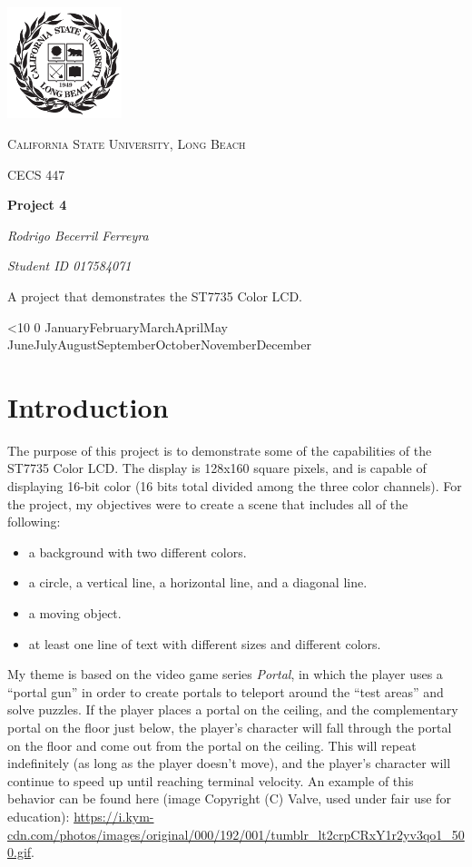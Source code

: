\documentclass{article}
\renewcommand{\today}{\ifnum\number\day<10 0\fi \number\day \space%
\ifcase \month \or January\or February\or March\or April\or May%
\or June\or July\or August\or September\or October\or November\or December\fi\space%
\number \year}
\begin{document}
\begin{titlepage}
	\centering
	\includegraphics[width=0.25\textwidth]{Images/247px-CSU-Longbeach_seal}\par\vspace{1cm}
	{\scshape\Large California State University, Long Beach \par}
	\vspace{1cm}
	{\scshape\Large CECS 447\par}
	\vspace{1.5cm}
	{\huge\bfseries Project 4\par}
	\vspace{2cm}
    {\Large\itshape Rodrigo Becerril Ferreyra\par}
    {\itshape\Large Student ID 017584071 \par}
	\vfill
    A project that demonstrates the ST7735
	Color LCD.

	\vfill

	{\large \today\par}
\end{titlepage}

\section{Introduction}
The purpose of this project is to demonstrate some of the
capabilities of the ST7735 Color LCD. The display is
128x160 square pixels, and is capable of displaying
16-bit color (16 bits total divided among the three color
channels). For the project, my objectives were to create a
scene that includes all of the following:
\begin{itemize}
	\item a background with two different colors.
	\item a circle, a vertical line, a horizontal line,
	and a diagonal line.
	\item a moving object.
	\item at least one line of text with different sizes
	and different colors.
\end{itemize}

My theme is based on the video game series \emph{Portal},
in which the player uses a ``portal gun'' in order to create
portals to teleport around the ``test areas'' and solve
puzzles. If the player places a portal on the ceiling,
and the complementary portal on the floor just below,
the player's character will fall through the portal
on the floor and come out from the portal on the ceiling.
This will repeat indefinitely (as long as the player
doesn't move), and the player's character will continue to
speed up until reaching terminal velocity. An example of
this behavior can be found here (image Copyright (C)
Valve, used under fair use for education):
\url{https://i.kym-cdn.com/photos/images/original/000/192/001/tumblr_lt2crpCRxY1r2yv3qo1_500.gif}.
\end{document}
